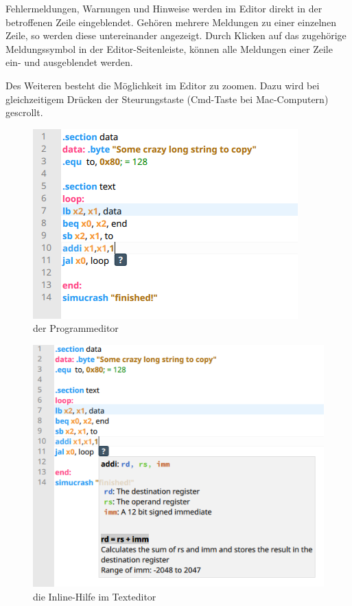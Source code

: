 Fehlermeldungen, Warnungen und Hinweise werden im Editor direkt in der betroffenen Zeile eingeblendet. Gehören mehrere Meldungen zu einer einzelnen Zeile, so werden diese untereinander angezeigt. Durch Klicken auf das zugehörige Meldungssymbol in der Editor-Seitenleiste, können alle Meldungen einer Zeile ein- und ausgeblendet werden.

Des Weiteren besteht die Möglichkeit im Editor zu zoomen. Dazu wird bei gleichzeitigem
Drücken der Steurungstaste (Cmd-Taste bei Mac-Computern) gescrollt.

\begin{figure}[ht]
	\centering
  \includegraphics[scale=1]{Images/Editor}
	\caption{der Programmeditor}
	\label{Editor}
\end{figure}


\begin{figure}[ht]
	\centering
  \includegraphics[scale=1]{Images/Editor_help}
	\caption{die Inline-Hilfe im Texteditor}
	\label{Editor_Help}
\end{figure}



